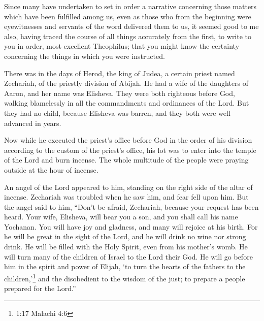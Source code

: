 





\vspace{-1.36in}


\mychapter{} \myverse*{}Since many have undertaken to set in order a narrative concerning
those matters which have been fulfilled among us,
\myverse{}even as those who from the beginning were eyewitnesses and servants of the word
delivered them to us,
\myverse{}it seemed good to me also, having traced the course of all things accurately
from the first, to write to you in order, most excellent Theophilus;
\myverse{}that you might know the certainty concerning the things in which you were instructed.

\myverse{}There was in the days of Herod, the king of Judea, a certain priest
named Zechariah, of the priestly division of Abijah. He had a wife of the daughters of Aaron, and her
name was Elisheva.
\myverse{}They were both righteous before God, walking blamelessly in all the commandments
and ordinances of the Lord.
\myverse{}But they had no child, because Elisheva was barren, and they both were well
advanced in years.

\myverse{}Now while he executed the priest’s office before God in the order
of his division
\myverse{}according to the custom of the priest’s office, his lot was to enter into the
temple of the Lord and burn incense.
\myverse{}The whole multitude of the people were praying outside at the hour of incense.

\myverse{}An angel of the Lord appeared to him, standing on the right side
of the altar of incense.
\myverse{}Zechariah was troubled when he saw him, and fear fell upon him.
\myverse{}But the angel said to him, “Don’t be afraid, Zechariah, because your request
has been heard. Your wife, Elisheva, will bear you a son, and you shall call his name Yochanan.
\myverse{}You will have joy and gladness, and many will rejoice at his birth.
\myverse{}For he will be great in the sight of the Lord, and he will drink no wine nor
strong drink. He will be filled with the Holy Spirit, even from his mother’s womb.
\myverse{}He will turn many of the children of Israel to the Lord their God.
\myverse{}He will go before him in the spirit and power of Elijah, ‘to turn the hearts
of the fathers to the children,’\footnote{ 1:17 Malachi 4:6} and the disobedient to the wisdom of the just;
to prepare a people prepared for the Lord.”

